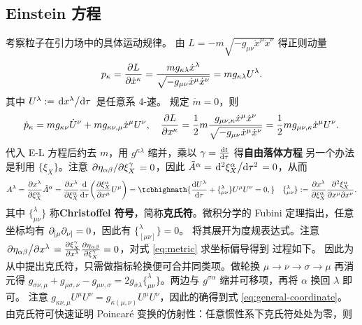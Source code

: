 \subsection{Einstein 方程}\label{sec:Einstein}

考察粒子在引力场中的具体运动规律。
由 $L=-m\sqrt{-g_{\mu\nu}\dot x^\mu\dot x^\nu}$ 得正则动量
\[p_\kappa=\pdv{L}{\dot x^\kappa} = \frac{mg_{\kappa\lambda}\dot x^\lambda}{\sqrt{-g_{\mu\nu}\dot x^\mu\dot x^\nu}} = mg_{\kappa\lambda}U^\lambda.\]
其中 $U^\lambda := \dv*{x^\lambda}{\tau}$ 是任意系 4-速。
规定 $\dot m = 0$，则 
\[\dot p_\kappa = mg_{\kappa\nu}\dot U^\nu + mg_{\kappa\nu,\mu} \dot x^\mu U^\nu,\quad \pdv{L}{x^\kappa}=\frac{1}{2}m\frac{g_{\mu\nu,\kappa}\dot x^\mu\dot x^\nu}{\sqrt{-g_{\mu\nu}\dot x^\mu\dot x^\nu}}=\frac{1}{2}mg_{\mu\nu,\kappa}\dot x^\mu U^\nu.\]
代入 E-L 方程后约去 $m$，用 $g^{\kappa\lambda}$ 缩并，乘以 $\gamma=\dv{t}{\tau}$ 得\textbf{自由落体方程}
另一个办法是利用 $\{\xi_X\}$。注意 $\pdv*{\eta_{\alpha\beta}}{\xi_X^\gamma} = 0$，因此 $\tilde A^\alpha=\dv*[2]{\xi_X^\alpha}{\tau}=0$，从而
\[A^\lambda=\pdv{x^\lambda}{\xi_X^\alpha}\tilde A^\alpha=\pdv{x^\lambda}{\xi_X^\alpha}\dv{\tau}(\pdv{\xi_X^\alpha}{x^\mu}U^\mu)=\tcbhighmath{\dv{U^\lambda}{\tau}+\{^\lambda_{\mu\nu}\}U^\mu U^\nu=0,} \quad \{^\lambda_{\mu\nu}\}:=\pdv{x^\lambda}{\xi_X^\alpha}\pdv{\xi_X^\alpha}{x^\mu}{x^\nu}.\]
其中 $\{^\lambda_{\mu\nu}\}$ 称\textbf{Christoffel 符号}，简称\textbf{克氏符}。微积分学的 Fubini 定理指出，任意坐标均有 $\partial_{[\mu}\partial_{\nu]}=0$，因此有 $\{^\lambda_{[\mu\nu]}\}=0$。
将其展开为度规表达式。注意 $\pdv*{\eta_{\alpha\beta}}{x^\lambda} = \pdv{\xi_X^\gamma}{x^\lambda}\pdv{\eta_{\alpha\beta}}{\xi_X^\gamma} = 0$，对式 \eqref{eq:metric} 求坐标偏导得到
过程如下。
因此为从中提出克氏符，只需做指标轮换便可合并同类项。做轮换 $\mu\to\nu\to\sigma\to\mu$ 再消元得 $g_{\sigma\nu,\mu}+ g_{\mu\sigma,\nu}-  g_{\mu\nu,\sigma}=2g_{\sigma\lambda}\{^\lambda_{\mu\nu}\}$。两边与 $g^{\sigma\alpha}$ 缩并可移项，再将 $\alpha$ 换回 $\lambda$ 即可。
注意 $g_{\kappa\nu,\mu}U^\mu U^\nu=g_{\kappa(\mu,\nu)}U^\mu U^\nu$，因此的确得到式 \eqref{eq:general-coordinate}。
由克氏符可快速证明 Poincaré 变换的仿射性：任意惯性系下克氏符处处为零，则

